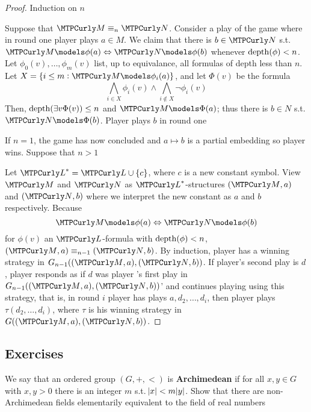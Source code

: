 \documentclass[11pt]{article}
\begin{document}
\begin{proof}
Induction on \(n\)

Suppose that \(\calm\equiv_n\caln\). Consider a play of the game where in
round one player  plays \(a\in M\). We claim that there is
\(b\in\caln\) s.t. \(\calm\models\phi(a)\Leftrightarrow\caln\models\phi(b)\)
whenever \(\operatorname{depth}(\phi)<n\). Let \(\phi_0(v),\dots,\phi_m(v)\) list, up to
equivalance, all formulas of depth less than \(n\). Let 
\(X=\{i\le m:\calm\models\phi_i(a)\}\), and let \(\Phi(v)\) be the formula
\begin{equation*}
\displaystyle\bigwedge_{i\in X}\phi_i(v)\wedge\bigwedge_{i\not\in X}
\neg\phi_i(v)
\end{equation*}
Then, \(\operatorname{depth}(\exists v\Phi(v))\le n\) and \(\calm\models\Phi(a)\); thus
there is \(b\in N\) s.t. \(\caln\models\Phi(b)\). Player  plays \(b\)
in round one

If \(n=1\), the game has now concluded and \(a\mapsto b\) is a partial
embedding so player  wins. Suppose that \(n>1\)

Let \(\call^*=\call\cup\{c\}\), where \(c\) is a new constant symbol. View
\(\calm\) and \(\caln\) as \(\call^*\)-structures \((\calm,a)\) and
\((\caln,b)\) where we interpret the new constant as \(a\) and \(b\)
respectively. Because 
\begin{equation*}
\calm\models\phi(a)\Leftrightarrow\caln\models\phi(b)
\end{equation*}
for \(\phi(v)\) an \(\call\)-formula with \(\operatorname{depth}(\phi)<n\),
\((\calm,a)\equiv_{n-1}(\caln,b)\). By induction, player  has a
winning strategy in \(G_{n-1}((\calm,a),(\caln,b))\). If player's second
play is \(d\), player  responds as if \(d\) was player 's
first play in \(G_{n-1}((\calm,a),(\caln,b))\)' and continues playing using
this strategy, that is, in round \(i\) player  has plays
\(a,d_2,\dots,d_i\), then player  plays \(\tau(d_2,\dots,d_i)\), where 
\(\tau\) is his winning strategy in \(G((\calm,a),(\caln,b))\).
\end{proof}

\subsection{Exercises}
\label{sec:orgd37fe10}
\begin{exercise}
\label{ex2.5.1}
We say that an ordered group \((G,+,<)\) is \textbf{Archimedean} if for all
\(x,y\in G\) with \(x,y>0\) there is an integer \(m\) s.t.
\(\abs{x}<m\abs{y}\). Show that there are non-Archimedean fields elementarily
equivalent to the field of real numbers
\end{exercise}
\end{document}
